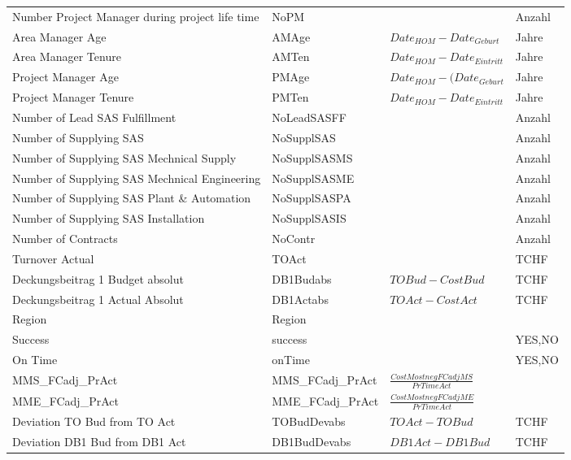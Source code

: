 \begin{landscape}
\begin{center}
\begin{longtable}{p{6cm}|p{4cm}|p{6cm}|p{3cm}}
		Number Project Manager during project life time & NoPM  &       & \multicolumn{1}{l}{Anzahl} \\
		Area Manager Age & AMAge & $Date_{HOM}-Date_{Geburt}$ & \multicolumn{1}{l}{Jahre} \\
		Area Manager Tenure & AMTen & $Date_{HOM}-Date_{Eintritt}$ & \multicolumn{1}{l}{Jahre} \\
		Project Manager Age & PMAge & $Date_{HOM}-(Date_{Geburt}$ & \multicolumn{1}{l}{Jahre} \\
		Project Manager Tenure & PMTen & $Date_{HOM}-Date_{Eintritt}$ & \multicolumn{1}{l}{Jahre} \\
		Number of Lead SAS Fulfillment & NoLeadSASFF &       & \multicolumn{1}{l}{Anzahl} \\
		Number of Supplying SAS & NoSupplSAS &       & \multicolumn{1}{l}{Anzahl} \\
		Number of Supplying SAS Mechnical Supply & NoSupplSASMS &       & \multicolumn{1}{l}{Anzahl} \\
		Number of Supplying SAS Mechnical Engineering & NoSupplSASME &       & \multicolumn{1}{l}{Anzahl} \\
		Number of Supplying SAS Plant \& Automation & NoSupplSASPA &       & \multicolumn{1}{l}{Anzahl} \\
		Number of Supplying SAS Installation & NoSupplSASIS &       & \multicolumn{1}{l}{Anzahl} \\
		Number of Contracts & NoContr &       & \multicolumn{1}{l}{Anzahl} \\
		Turnover Actual & TOAct &       & \multicolumn{1}{l}{TCHF} \\
		Deckungsbeitrag 1 Budget absolut & DB1Budabs & $TOBud-CostBud$ & \multicolumn{1}{l}{TCHF} \\
		Deckungsbeitrag 1 Actual Absolut & DB1Actabs & $TOAct-CostAct$ & \multicolumn{1}{l}{TCHF} \\
		Region & Region &       &  \\
		Success & success &       & {YES,NO} \\
		On Time & onTime &       & {YES,NO} \\
		MMS\_FCadj\_PrAct & MMS\_FCadj\_PrAct & $\frac{CostMostnegFCadjMS}{PrTimeAct}$ & \\
		MME\_FCadj\_PrAct & MME\_FCadj\_PrAct & $\frac{CostMostnegFCadjME}{PrTimeAct}$ &  \\
		Deviation TO Bud from TO Act & TOBudDevabs & $TOAct-TOBud$ & TCHF \\
		Deviation DB1 Bud from DB1 Act & DB1BudDevabs & $DB1Act-DB1Bud$ & TCHF \\

\end{longtable}
\end{center}
\end{landscape}
